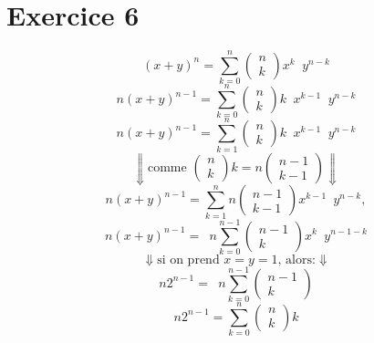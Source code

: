 \documentclass[fontsize=10pt]{article}
\begin{document}
\section*{Exercice 6}
$$ (x+y)^{n}
= \underset{k=0}{\overset{n}{\sum}}
\begin{pmatrix} 
n\\
k
\end{pmatrix}x^{k}\phantom{a}y^{n-k} $$
$$ n(x+y)^{n-1}
= \underset{k=0}{\overset{n}{\sum}}
\begin{pmatrix} 
n\\
k
\end{pmatrix}k\phantom{a}x^{k-1}\phantom{a}y^{n-k} $$
$$ n(x+y)^{n-1}
= \underset{k=1}{\overset{n}{\sum}}
\begin{pmatrix} 
n\\
k
\end{pmatrix}k\phantom{a}x^{k-1}\phantom{a}y^{n-k} $$
$$\Downarrow \text{comme } \begin{pmatrix} 
n\\
k
\end{pmatrix}k
= n\begin{pmatrix} 
n-1\\
k-1
\end{pmatrix} \Downarrow$$
$$ n(x+y)^{n-1}
= \underset{k=1}{\overset{n}{\sum}}
n\begin{pmatrix} 
n-1\\
k-1
\end{pmatrix}x^{k-1}\phantom{a}y^{n-k}, $$
$$ n(x+y)^{n-1}
= \phantom{a}n
\underset{k=0}{\overset{n-1}{\sum}}
\begin{pmatrix} 
n-1\\
k
\end{pmatrix}x^{k}\phantom{a}y^{n-1-k} $$
$$\Downarrow \text{si on prend $x=y=1$, alors:} \Downarrow$$
$$ n2^{n-1}
= \phantom{a}n
\underset{k=0}{\overset{n-1}{\sum}}
\begin{pmatrix} 
n-1\\
k
\end{pmatrix} $$
$$ n2^{n-1}
= \underset{k=0}{\overset{n}{\sum}}
\begin{pmatrix} 
n\\
k
\end{pmatrix}k $$
\end{document}
